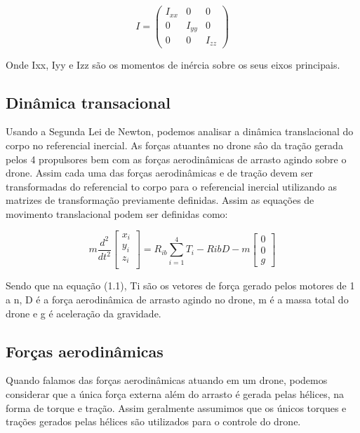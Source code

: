 \begin{equation*}
	I = \begin{pmatrix}
		I_{xx} & 0      & 0      \\
		0      & I_{yy} & 0      \\
		0      & 0      & I_{zz}
	\end{pmatrix}
\end{equation*}

Onde Ixx, Iyy e Izz são os momentos de inércia sobre os seus eixos principais.


\subsection{Dinâmica transacional}

Usando a Segunda Lei de Newton, podemos analisar a dinâmica translacional do corpo no referencial inercial. As forças atuantes no drone sâo da tração gerada pelos 4 propulsores bem com as forças aerodinâmicas de arrasto agindo sobre o drone. Assim cada uma das forças aerodinâmicas e de tração devem ser transformadas do referencial to corpo para o referencial inercial utilizando as matrizes de transformação previamente definidas. Assim as equações de movimento translacional podem ser definidas como:


\begin{equation}
	{m}\frac{d^2}{dt^2}
	\begin{bmatrix}
		x_i \\
		y_i \\
		z_i \\
	\end{bmatrix} =
	R_{ib}\sum_{i=1}^{4}T_i -R{ib}D - m
	\begin{bmatrix}
		0 \\
		0 \\
		g
	\end{bmatrix}
\end{equation}

Sendo que na equação (1.1), Ti são os vetores de força gerado pelos motores de 1 a n, D é a força aerodinâmica de arrasto agindo no drone, m é a massa total do drone e g é aceleração da gravidade.


\subsection{Forças aerodinâmicas}

Quando falamos das forças aerodinâmicas atuando em um drone, podemos considerar que a única força externa além do arrasto é gerada pelas hélices, na forma de torque e tração. Assim geralmente assumimos que os únicos torques e trações gerados pelas hélices são utilizados para o controle do drone.


